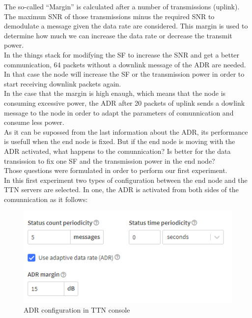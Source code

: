 The so-called “Margin” is calculated after a number of transmissions (uplink).
The maximun SNR of those transmissions minus the required SNR to demodulate a 
message given the data rate are considered. This margin is used to determine 
how much we can increase the data rate or decrease the transmit power.\\

In the things stack for modifying the SF to increase the SNR and get a better communication, 
64 packets without a downlink message of the ADR are needed. In that case the node will 
increase the SF or the transmission power in order to start receiving downlink packets again.\\

In the case that the margin is high enaugh, which means that the node is consuming excessive power, 
the ADR after 20 packets of uplink sends a dowlink message to the node in order to adapt the 
parameters of comunnication and consume less power.\\

As it can be supossed from the last information about the ADR, its performance is usefull 
when the end node is fixed. But if the end node is moving with the ADR activated, 
what happens to the comunnication? Is better for the data transission to fix one 
SF and the transmission power in the end node?\\

Those questions were formulated in order to perform our first experiment.\\
In this first experiment two types of configuration between the end node and the TTN servers are selected. 
In one, the ADR is activated from both sides of the comunnication as it follows:

\begin{figure}[htbp]
    \includegraphics[width=\linewidth]{ADR_config}
    \caption{ADR configuration in TTN console}
\end{figure}

